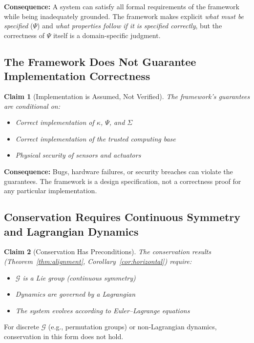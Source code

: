 \documentclass[12pt]{article}
\newtheorem{claim}{Claim}
\theoremstyle{definition}
\theoremstyle{remark}
\newcommand{\calG}{\mathcal{G}}
\begin{document}
\textbf{Consequence:} A system can satisfy all formal requirements of the framework while being
inadequately grounded. The framework makes explicit \emph{what must be specified} ($\Psi$) and \emph{what
properties follow if it is specified correctly}, but the correctness of $\Psi$ itself is a domain-specific
judgment.

\subsection{The Framework Does Not Guarantee Implementation Correctness}

\begin{claim}[Implementation is Assumed, Not Verified]\label{claim:impl}
The framework's guarantees are conditional on:
\begin{itemize}
    \item Correct implementation of $\kappa$, $\Psi$, and $\Sigma$
    \item Correct implementation of the trusted computing base
    \item Physical security of sensors and actuators
\end{itemize}
\end{claim}

\textbf{Consequence:} Bugs, hardware failures, or security breaches can violate the guarantees.
The framework is a design specification, not a correctness proof for any particular implementation.

\subsection{Conservation Requires Continuous Symmetry and Lagrangian Dynamics}

\begin{claim}[Conservation Has Preconditions]\label{claim:conservation}
The conservation results (Theorem~\ref{thm:alignment}, Corollary~\ref{cor:horizontal}) require:
\begin{itemize}
    \item $\calG$ is a Lie group (continuous symmetry)
    \item Dynamics are governed by a Lagrangian
    \item The system evolves according to Euler--Lagrange equations
\end{itemize}
\end{claim}

For discrete $\calG$ (e.g., permutation groups) or non-Lagrangian dynamics, conservation in this form
does not hold.
\end{document}
